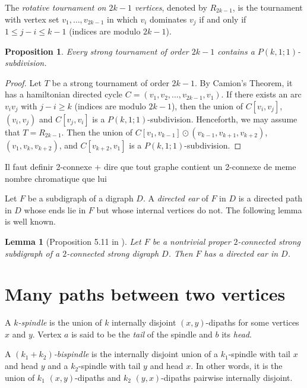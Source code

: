 \documentclass[utf8,10pt]{article}
\theoremstyle{plain}
\newtheorem{lemma}[theorem]{Lemma}
\newtheorem{proposition}[theorem]{Proposition}
\theoremstyle{definition}
\theoremstyle{remark}
\newcommand{\FH}[1]{{\color{red}{\bf Fred:} #1}}
\begin{document}
The {\it rotative tournament on $2k-1$ vertices}, denoted by $R_{2k-1}$, is the tournament with vertex set $v_1, \dots , v_{2k-1}$ in which $v_i$ dominates $v_j$ if and only if $1\leq j-i \leq k-1$ (indices are modulo $2k-1$).


\begin{proposition}\label{prop:tournoi}
Every strong tournament of order $2k-1$ contains a $P(k,1;1)$-subdivision.
\end{proposition}
\begin{proof}
Let $T$ be a strong tournament of order $2k-1$. By Camion's Theorem, it has a hamiltonian directed cycle $C=(v_1,v_2, \dots ,v_{2k-1},v_1)$.
If there exists an arc $v_iv_j$ with $j-i\geq k$  (indices are modulo $2k-1$), then the union of  $C[v_i,v_j]$, $(v_i,v_j)$ and $C[v_j,v_i]$ is a $P(k,1;1)$-subdivision.
Henceforth, we may assume that $T=R_{2k-1}$.
Then the union of $C[v_1, v_{k-1}] \odot (v_{k-1}, v_{k+1}, v_{k+2})$,  $(v_1, v_{k}, v_{k+2})$, and $C[v_{k+2}, v_1]$ is a $P(k,1;1)$-subdivision.
\end{proof}

\FH{Il faut definir 2-connexe + dire que tout graphe contient un 2-connexe de meme nombre chromatique que lui}

Let $F$ be a subdigraph of a digraph $D$. A {\em directed
  ear} of $F$ in $D$ is a directed path in $D$ whose ends lie in $F$ but whose internal
vertices do not.   The following lemma is well known.

\begin{lemma}[Proposition 5.11 in \cite{BoMu08}] \label{lem:diear}
Let $F$ be a nontrivial proper $2$-connected strong subdigraph of a
$2$-connected strong digraph $D$. Then $F$ has a directed ear in $D$.
\end{lemma}


\section{Many paths between two vertices}

A {\it $k$-spindle} is the union of $k$ internally disjoint $(x,y)$-dipaths for some vertices $x$ and $y$. Vertex $a$ is said to be the {\it tail} of the spindle and $b$ its {\it head}.

A {\it $(k_1+k_2)$-bispindle} is the internally disjoint union of a $k_1$-spindle
with tail $x$ and head $y$ and a  $k_2$-spindle with tail $y$ and head $x$.
In other words, it is the union of $k_1$  $(x,y)$-dipaths and $k_2$ $(y,x)$-dipaths pairwise internally disjoint.
\end{document}
